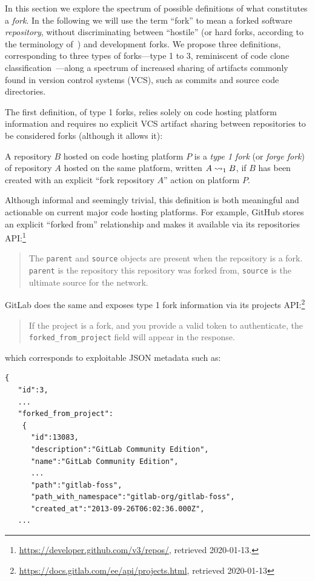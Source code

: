 In this section we explore the spectrum of possible definitions of what
constitutes a \emph{fork}. In the following we will use the term ``fork'' to
mean a forked software \emph{repository}, without discriminating between
``hostile'' (or hard forks, according to the terminology
of~\cite{zhou2019fork}) and development forks. We propose three definitions,
corresponding to three types of forks---type 1 to 3, reminiscent of code clone
classification~\cite{roy2007clonedetectionsurvey,
  rattan2013clonedetectionreview}---along a spectrum of increased sharing of
artifacts commonly found in version control systems (VCS), such as commits and
source code directories.

The first definition, of type 1 forks, relies solely on code hosting platform
information and requires no explicit VCS artifact sharing between repositories
to be considered forks (although it allows it):
\begin{definition}%
  \label{def:forge-fork}%
  \label{def:type1-fork}
  A repository $B$ hosted on code hosting platform $P$ is a \emph{type 1 fork}
  (or \emph{forge fork}) of repository $A$ hosted on the same platform, written
  $A\rightsquigarrow_1 B$, if $B$ has been created with an explicit ``fork repository
  $A$'' action on platform $P$.
\end{definition}

Although informal and seemingly trivial, this definition is both meaningful and
actionable on current major code hosting platforms. For example, GitHub stores
an explicit ``forked from'' relationship and makes it available via its
repositories API:\footnote{\url{https://developer.github.com/v3/repos/},
  retrieved 2020-01-13.}
\begin{quote}
  The \texttt{parent} and \texttt{source} objects are present when the
  repository is a fork. \texttt{parent} is the repository this repository was
  forked from, \texttt{source} is the ultimate source for the network.
\end{quote}
GitLab does the same and exposes type 1 fork information via its projects
API:\footnote{\url{https://docs.gitlab.com/ee/api/projects.html}, retrieved
  2020-01-13}
\begin{quote}
  If the project is a fork, and you provide a valid token to authenticate, the
  \texttt{forked\_from\_project} field will appear in the response.
\end{quote}
which corresponds to exploitable JSON metadata such as:

\begin{minipage}{0.96\linewidth}
\begin{verbatim}
{
   "id":3,
   ...
   "forked_from_project":
    {
      "id":13083,
      "description":"GitLab Community Edition",
      "name":"GitLab Community Edition",
      ...
      "path":"gitlab-foss",
      "path_with_namespace":"gitlab-org/gitlab-foss",
      "created_at":"2013-09-26T06:02:36.000Z",
   ...
\end{verbatim}
\end{minipage}

